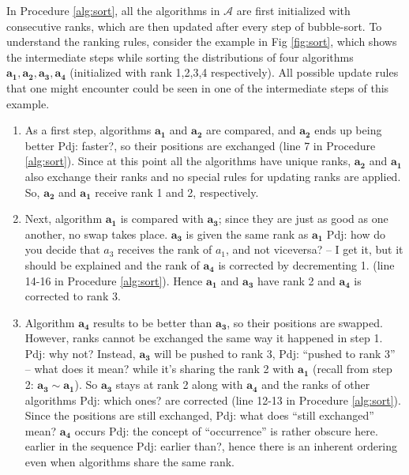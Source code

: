 \documentclass[conference]{IEEEtran}
\newcommand{\p}[1]{{\color{blue} Pdj: #1}}
\begin{document}
In Procedure \ref{alg:sort}, all the algorithms in $\mathcal{A}$ are first initialized with consecutive ranks, which are then updated after every step of bubble-sort. To understand the ranking rules, consider the example in Fig \ref{fig:sort}, which shows the intermediate steps while sorting the distributions of four algorithms $\mathbf{a_1}, \mathbf{a_2}, \mathbf{a_3},\mathbf{a_4}$ (initialized with rank 1,2,3,4 respectively). All possible update rules that one might encounter could be seen in one of the intermediate steps of this example.

\begin{enumerate}
	\item 
          As a first step, algorithms $\mathbf{a_1}$ and $\mathbf{a_2}$ are compared, and 
          $\mathbf{a_2}$ ends up being better \p{faster?}, so their positions are exchanged (line 7 in
          Procedure \ref{alg:sort}). Since at this point all the algorithms have unique ranks, $\mathbf{a_2}$ and
          $\mathbf{a_1}$ also exchange their ranks and no special rules for updating ranks are applied.
          So, $\mathbf{a_2}$ and $\mathbf{a_1}$ receive rank 1 and 2, respectively.
	
	\item Next, algorithm $\mathbf{a_1}$ is compared with $\mathbf{a_3}$;
          since they are just as good as one another, 
          no swap takes place.
          $\mathbf{a_3}$ is given the same rank as $\mathbf{a_1}$ \p{how do you decide that $a_3$ receives the rank of
            $a_1$, and not viceversa? -- I get it, but it should be explained}
            and the rank of $\mathbf{a_4}$ is corrected by
         decrementing 1. (line 14-16 in Procedure \ref{alg:sort}). Hence $\mathbf{a_1}$ and $\mathbf{a_3}$ have rank 2 and $\mathbf{a_4}$ is corrected to rank 3.
	
	\item Algorithm $\mathbf{a_4}$ results to be better than $\mathbf{a_3}$, so their positions are
          swapped. However, ranks cannot be exchanged the same way it happened in step 1.
          \p{why not?}
          Instead, $\mathbf{a_3}$ will be pushed to rank 3, \p{``pushed to rank 3'' -- what does it mean?} while it's
          sharing the rank 2 with $\mathbf{a_1}$ (recall from step 2: $\mathbf{a_3} \sim \mathbf{a_1}$). So
          $\mathbf{a_3}$ stays at rank 2 along with $\mathbf{a_4}$ and the ranks of other algorithms \p{which ones?} are
          corrected (line 12-13 in Procedure \ref{alg:sort}). Since the positions are still exchanged, \p{what does
            ``still exchanged'' mean?} $\mathbf{a_4}$ occurs \p{the concept of ``occurrence'' is rather obscure
            here.} earlier in the sequence \p{earlier than?}, hence there is an inherent ordering even when algorithms share the same rank. 
		

\end{enumerate}
\end{document}
